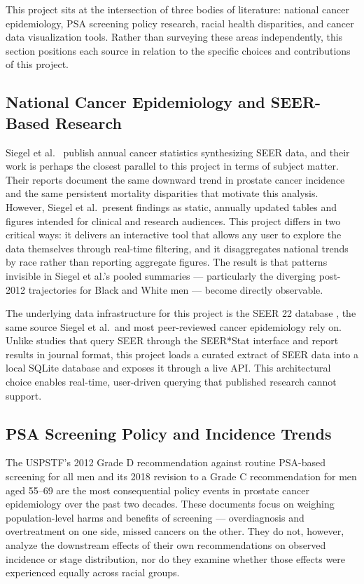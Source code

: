 This project sits at the intersection of three bodies of literature: national cancer
epidemiology, PSA screening policy research, racial health disparities, and cancer
data visualization tools. Rather than surveying these areas independently, this
section positions each source in relation to the specific choices and contributions
of this project.

\subsection{National Cancer Epidemiology and SEER-Based Research}

Siegel et al.\ \cite{siegel2023} publish annual cancer statistics synthesizing SEER
data, and their work is perhaps the closest parallel to this project in terms of
subject matter. Their reports document the same downward trend in prostate cancer
incidence and the same persistent mortality disparities that motivate this analysis.
However, Siegel et al.\ present findings as static, annually updated tables and
figures intended for clinical and research audiences. This project differs in two
critical ways: it delivers an interactive tool that allows any user to explore the
data themselves through real-time filtering, and it disaggregates national trends
by race rather than reporting aggregate figures. The result is that patterns
invisible in Siegel et al.'s pooled summaries --- particularly the diverging
post-2012 trajectories for Black and White men --- become directly observable.

The underlying data infrastructure for this project is the SEER 22 database
\cite{seer2024}, the same source Siegel et al.\ and most peer-reviewed cancer
epidemiology rely on. Unlike studies that query SEER through the SEER*Stat interface
and report results in journal format, this project loads a curated extract of SEER
data into a local SQLite database and exposes it through a live API. This
architectural choice enables real-time, user-driven querying that published research
cannot support.

\subsection{PSA Screening Policy and Incidence Trends}

The USPSTF's 2012 Grade D recommendation against routine PSA-based screening for
all men \cite{uspstf2012} and its 2018 revision to a Grade C recommendation for
men aged 55--69 \cite{uspstf2018} are the most consequential policy events in
prostate cancer epidemiology over the past two decades. These documents focus on
weighing population-level harms and benefits of screening --- overdiagnosis and
overtreatment on one side, missed cancers on the other. They do not, however,
analyze the downstream effects of their own recommendations on observed incidence
or stage distribution, nor do they examine whether those effects were experienced
equally across racial groups.


